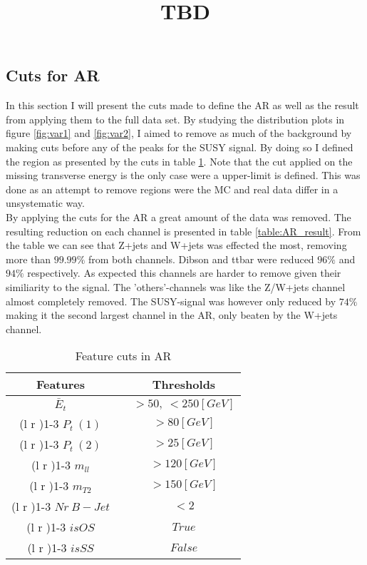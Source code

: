 \documentclass{article}
\begin{document}
\subsection{Cuts for AR}
In this section I will present the cuts made to define the AR as well as the result from applying them to the full data set. By studying the distribution plots in figure \ref{fig:var1} and \ref{fig:var2}, I aimed to remove as much of the background by making cuts before any of the peaks for the SUSY signal. By doing so I defined the region as presented by the cuts in table \ref{table:AR}. Note that the cut applied on the missing transverse energy is the only case were a upper-limit is defined. This was done as an attempt to remove regions were the MC and real data differ in a unsystematic way. \\
By applying the cuts for the AR a great amount of the data was removed. The resulting reduction on each channel is presented in table \ref{table:AR_result}. From the table we can see that Z+jets and W+jets was effected the most, removing more than $99.99\%$ from both channels. Dibson and ttbar were reduced $96\%$ and $94\%$ respectively. As expected this channels are harder to remove given their similiarity to the signal. The 'others'-channels was like the Z/W+jets channel almost completely removed. The SUSY-signal was however only reduced by $74\%$ making it the second largest channel in the AR, only beaten by the W+jets channel.
\bgroup
\title{TBD}
{\tabcolsep=20pt
\begin{table}[h!]
    \caption{Feature cuts in AR}
    \label{table:AR}
    \centering 
    \begin{threeparttable}
    \begin{tabular}{ccc}
    Features & & Thresholds\\
     \midrule\midrule
    $\bar{E}_t$   & &  $> 50, \ < 250[GeV]$  \\%
    \cmidrule(l  r ){1-3}
     $P_t \ (1)$ & &  $> 80[GeV]$  \\ 
    \cmidrule(l r ){1-3}
     $P_t \ (2)$ & & $>25[GeV]$  \\ 
    \cmidrule(l r ){1-3}
    $m_{ll}$ & & $>120[GeV]$  \\
    \cmidrule(l r ){1-3}
    $m_{T2}$  & & $>150[GeV]$ \\
    \cmidrule(l r ){1-3}
    $Nr\ B-Jet$ & & $<2$  \\ 
    \cmidrule(l r ){1-3}
    $isOS$ & & $True$  \\ 
    \cmidrule(l r ){1-3}
    $isSS$ & & $False$  \\ 
    \midrule\midrule
    \end{tabular}
    \end{threeparttable}
\end{table}
}
\end{document}
